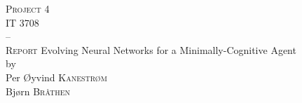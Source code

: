 \documentclass[11pt, oneside]{article}
\begin{document}
	\begin{titlepage}
		\begin{center}
			{ \Huge \textsc{Project 4\\IT 3708}\\--\\
			\textsc{Report}
			\vfill
			{ \Huge Evolving Neural Networks for a Minimally-Cognitive Agent}\\[0.5em]
			{ \LARGE by\\[2em]
			Per Øyvind \textsc{Kanestrøm}\\
			Bjørn \textsc{Bråthen}\\
			}
			\vfill
			}
		\end{center}
	\end{titlepage}




\end{document}
